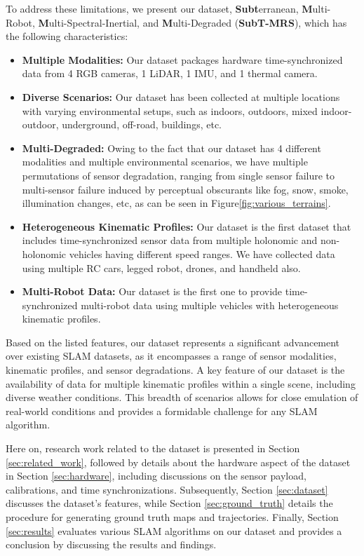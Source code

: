 \documentclass[10pt,twocolumn,letterpaper]{article}
\begin{document}
To address these limitations, we present our dataset, \textbf{Subt}erranean, \textbf{M}ulti-Robot, \textbf{M}ulti-Spectral-Inertial, and \textbf{M}ulti-Degraded (\textbf{SubT-MRS}), which has the following characteristics:

\begin{itemize}[noitemsep,topsep=0pt]

    \item \textbf{Multiple Modalities:} Our dataset packages hardware time-synchronized data from 4 RGB cameras, 1 LiDAR, 1 IMU, and 1 thermal camera. 
    \item \textbf{Diverse Scenarios:} Our dataset has been collected at multiple locations with varying environmental setups, such as indoors, outdoors, mixed indoor-outdoor, underground, off-road, buildings, etc.
    \item\textbf{Multi-Degraded:} Owing to the fact that our dataset has 4 different modalities and multiple environmental scenarios, we have multiple permutations of sensor degradation, ranging from single sensor failure to multi-sensor failure induced by perceptual obscurants like fog, snow, smoke, illumination changes, etc, as can be seen in Figure\ref{fig:various_terrains}.
    \item \textbf{Heterogeneous Kinematic Profiles:} Our dataset is the first dataset that includes time-synchronized sensor data from multiple holonomic and non-holonomic vehicles having different speed ranges. We have collected data using multiple RC cars, legged robot, drones, and handheld also.
    \item\textbf{Multi-Robot Data:} Our dataset is the first one to provide time-synchronized multi-robot data using multiple vehicles with heterogeneous kinematic profiles.
    

\end{itemize}

Based on the listed features, our dataset represents a significant advancement over existing SLAM datasets, as it encompasses a range of sensor modalities, kinematic profiles, and sensor degradations. A key feature of our dataset is the availability of data for multiple kinematic profiles within a single scene, including diverse weather conditions. This breadth of scenarios allows for close emulation of real-world conditions and provides a formidable challenge for any SLAM algorithm.

Here on, research work related to the dataset is presented in Section \ref{sec:related_work}, followed by details about the hardware aspect of the dataset in Section \ref{sec:hardware}, including discussions on the sensor payload, calibrations, and time synchronizations. Subsequently, Section \ref{sec:dataset} discusses the dataset's features, while Section \ref{sec:ground_truth} details the procedure for generating ground truth maps and trajectories. Finally, Section \ref{sec:results} evaluates various SLAM algorithms on our dataset and provides a conclusion by discussing the results and findings.
\end{document}

